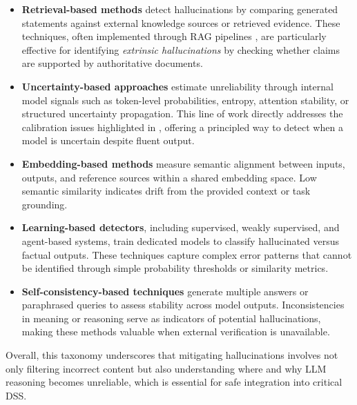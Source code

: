 \begin{itemize}


    \item \textbf{Retrieval-based methods} detect hallucinations by comparing generated statements against external knowledge sources or retrieved evidence. These techniques, often implemented through RAG pipelines \cite{lewis2020retrieval}, are particularly effective for identifying \textit{extrinsic hallucinations} by checking whether claims are supported by authoritative documents.

    \item \textbf{Uncertainty-based approaches} estimate unreliability through internal model signals such as token-level probabilities, entropy, attention stability, or structured uncertainty propagation. This line of work directly addresses the calibration issues highlighted in \cite{jiang2021can}, offering a principled way to detect when a model is uncertain despite fluent output.

    \item \textbf{Embedding-based methods} measure semantic alignment between inputs, outputs, and reference sources within a shared embedding space. Low semantic similarity indicates drift from the provided context or task grounding.

    \item \textbf{Learning-based detectors}, including supervised, weakly supervised, and agent-based systems, train dedicated models to classify hallucinated versus factual outputs. These techniques capture complex error patterns that cannot be identified through simple probability thresholds or similarity metrics.

    \item \textbf{Self-consistency-based techniques} generate multiple answers or paraphrased queries to assess stability across model outputs. Inconsistencies in meaning or reasoning serve as indicators of potential hallucinations, making these methods valuable when external verification is unavailable.

\end{itemize}

Overall, this taxonomy underscores that mitigating hallucinations involves not only filtering incorrect content but also understanding where and why LLM reasoning becomes unreliable, which is essential for safe integration into critical DSS.

